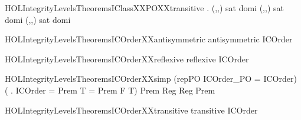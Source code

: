 \newcommand{\HOLIntegrityLevelsTheoremsIClassXXPOXXreflexive}{\UseVerbatim{HOLIntegrityLevelsTheoremsIClassXXPOXXreflexive}}
\begin{SaveVerbatim}{HOLIntegrityLevelsTheoremsIClassXXPOXXtransitive}
\HOLTokenTurnstile{} \HOLTokenForall{}     .
     (,,) sat  domi  \HOLTokenImp{}
     (,,) sat  domi  \HOLTokenImp{}
     (,,) sat  domi 
\end{SaveVerbatim}
\newcommand{\HOLIntegrityLevelsTheoremsIClassXXPOXXtransitive}{\UseVerbatim{HOLIntegrityLevelsTheoremsIClassXXPOXXtransitive}}
\begin{SaveVerbatim}{HOLIntegrityLevelsTheoremsICOrderXXantisymmetric}
\HOLTokenTurnstile{} antisymmetric ICOrder
\end{SaveVerbatim}
\newcommand{\HOLIntegrityLevelsTheoremsICOrderXXantisymmetric}{\UseVerbatim{HOLIntegrityLevelsTheoremsICOrderXXantisymmetric}}
\begin{SaveVerbatim}{HOLIntegrityLevelsTheoremsICOrderXXreflexive}
\HOLTokenTurnstile{} reflexive ICOrder
\end{SaveVerbatim}
\newcommand{\HOLIntegrityLevelsTheoremsICOrderXXreflexive}{\UseVerbatim{HOLIntegrityLevelsTheoremsICOrderXXreflexive}}
\begin{SaveVerbatim}{HOLIntegrityLevelsTheoremsICOrderXXsimp}
\HOLTokenTurnstile{} (repPO ICOrder_PO = ICOrder) \HOLTokenConj{}
   (\HOLTokenForall{} .
      ICOrder   \HOLTokenEquiv{}
        = Prem  T    = Prem  F  T) \HOLTokenConj{}
   Prem \HOLTokenNotEqual{} Reg \HOLTokenConj{} Reg \HOLTokenNotEqual{} Prem
\end{SaveVerbatim}
\newcommand{\HOLIntegrityLevelsTheoremsICOrderXXsimp}{\UseVerbatim{HOLIntegrityLevelsTheoremsICOrderXXsimp}}
\begin{SaveVerbatim}{HOLIntegrityLevelsTheoremsICOrderXXtransitive}
\HOLTokenTurnstile{} transitive ICOrder
\end{SaveVerbatim}
\newcommand{\HOLIntegrityLevelsTheoremsICOrderXXtransitive}{\UseVerbatim{HOLIntegrityLevelsTheoremsICOrderXXtransitive}}
